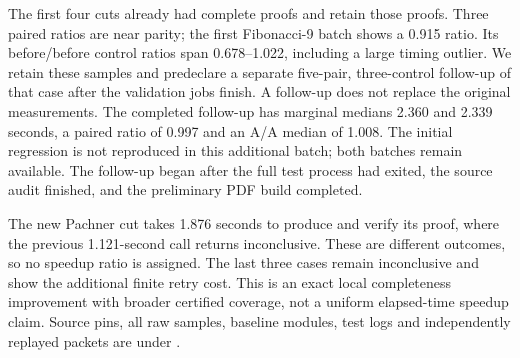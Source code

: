 

The first four cuts already had complete proofs and retain those proofs.
Three paired ratios are near parity; the first Fibonacci-9 batch shows a
0.915 ratio. Its before/before control ratios span 0.678--1.022, including
a large timing outlier. We retain these samples and predeclare a separate
five-pair, three-control follow-up of that case after the validation jobs
finish. A follow-up does not replace the original measurements. The completed
follow-up has marginal medians 2.360 and 2.339 seconds, a paired ratio of
0.997 and an A/A median of 1.008. The initial regression is not reproduced
in this additional batch; both batches remain available. The follow-up
began after the full test process had exited, the source audit finished,
and the preliminary PDF build completed.

The new Pachner cut takes 1.876 seconds to produce and verify its proof,
where the previous 1.121-second call returns inconclusive. These are
different outcomes, so no speedup ratio is assigned. The last three cases
remain inconclusive and show the additional finite retry cost. This is an
exact local completeness improvement with broader certified coverage,
not a uniform elapsed-time speedup claim. Source pins, all raw samples,
baseline modules, test logs and independently replayed packets are under
.
